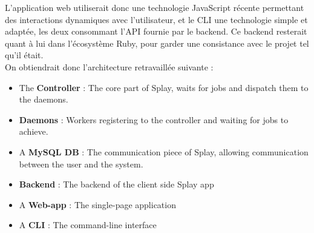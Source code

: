 \documentclass{eplmastersthesis}
\begin{document}
        L'application web utiliserait donc une technologie JavaScript récente
        permettant des interactions dynamiques avec l'utilisateur, et le CLI
        une technologie simple et adaptée, les deux consommant l'API fournie
        par le backend. Ce backend resterait quant à lui dans l'écosystème Ruby,
        pour garder une consistance avec le projet tel qu'il était.\\

        On obtiendrait donc l'architecture retravaillée suivante :

        \begin{itemize}
          \item The \textbf{Controller} : The core part of Splay, waits for jobs
          and dispatch them to the daemons.
          \item \textbf{Daemons} : Workers registering to the controller and waiting
          for jobs to achieve.
          \item A \textbf{MySQL DB} : The communication piece of Splay, allowing
          communication between the user and the system.
          \item \textbf{Backend} : The backend of the client side Splay app
          \item A \textbf{Web-app} : The single-page application
          \item A \textbf{CLI} : The command-line interface
        \end{itemize}
\end{document}
